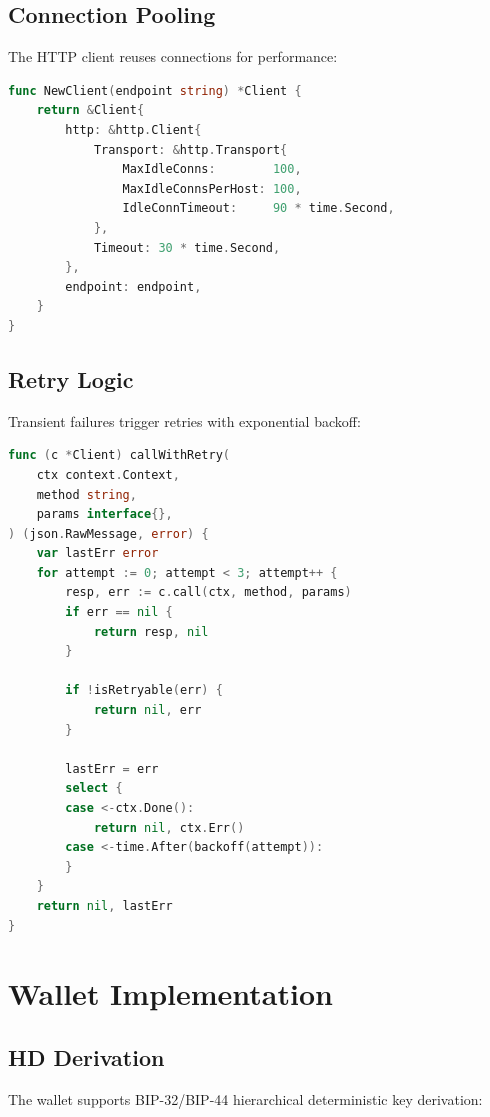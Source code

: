 \documentclass[11pt,twocolumn]{article}
\begin{document}
\subsection{Connection Pooling}

The HTTP client reuses connections for performance:

\begin{lstlisting}[language=Go,caption=Connection Configuration]
func NewClient(endpoint string) *Client {
    return &Client{
        http: &http.Client{
            Transport: &http.Transport{
                MaxIdleConns:        100,
                MaxIdleConnsPerHost: 100,
                IdleConnTimeout:     90 * time.Second,
            },
            Timeout: 30 * time.Second,
        },
        endpoint: endpoint,
    }
}
\end{lstlisting}

\subsection{Retry Logic}

Transient failures trigger retries with exponential backoff:

\begin{lstlisting}[language=Go,caption=Retry Wrapper]
func (c *Client) callWithRetry(
    ctx context.Context,
    method string,
    params interface{},
) (json.RawMessage, error) {
    var lastErr error
    for attempt := 0; attempt < 3; attempt++ {
        resp, err := c.call(ctx, method, params)
        if err == nil {
            return resp, nil
        }

        if !isRetryable(err) {
            return nil, err
        }

        lastErr = err
        select {
        case <-ctx.Done():
            return nil, ctx.Err()
        case <-time.After(backoff(attempt)):
        }
    }
    return nil, lastErr
}
\end{lstlisting}

\section{Wallet Implementation}

\subsection{HD Derivation}

The wallet supports BIP-32/BIP-44 hierarchical deterministic key derivation:
\end{document}
